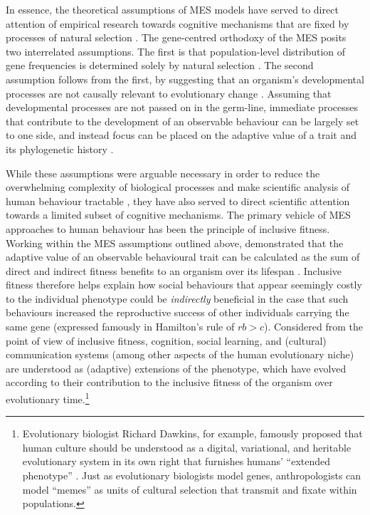 \begin{CJK}{UTF8}{gbsn}
In essence, the theoretical assumptions of MES models have served to direct attention of empirical research towards cognitive mechanisms that are fixed by processes of natural selection \citep{Lickliter2003,Kenrick2001}.  The gene-centred orthodoxy of the MES posits two interrelated assumptions.  The first is that population-level distribution of gene frequencies is determined solely by natural selection \citep[including associated stochastic mechanisms of mutation, and genetic drift][]{Grafen1991}.  The second assumption follows from the first, by suggesting that an organism's developmental processes are not causally relevant to evolutionary change \citep[also known as the ``phenotypic gambit''; see][]{Grafen1984}.  Assuming that developmental processes are not passed on in the germ-line, immediate processes that contribute to the development of an observable behaviour can be largely set to one side, and instead focus can be placed on the adaptive value of a trait and its phylogenetic history \citep{Mayr1961,Dunbar1996}.

While these assumptions were arguable necessary in order to reduce the overwhelming complexity of biological processes and make scientific analysis of human behaviour tractable \citep{Mayr1961}, they have also served to direct scientific attention towards a limited subset of cognitive mechanisms.  The primary vehicle of MES approaches to human behaviour has been the principle of inclusive fitness. Working within the MES assumptions outlined above, \textcite{Hamilton1964} demonstrated that the adaptive value of an observable behavioural trait can be calculated as the sum of direct and indirect fitness benefits to an organism over its lifespan \citep{Grafen2006}.  Inclusive fitness therefore helps explain how social behaviours that appear seemingly costly to the individual phenotype could be \textit{indirectly} beneficial in the case that such behaviours increased the reproductive success of other individuals carrying the same gene (expressed famously in Hamilton's rule of $rb > c$).  Considered from the point of view of inclusive fitness, cognition, social learning, and (cultural) communication systems (among other aspects of the human evolutionary niche) are understood as (adaptive) extensions of the phenotype, which have evolved according to their contribution to the inclusive fitness of the organism over evolutionary time.\footnote{Evolutionary biologist Richard Dawkins, for example, famously proposed that human culture should be understood as a digital, variational, and heritable evolutionary system in its own right that furnishes humans' ``extended phenotype'' \citep{Dawkins1982}.  Just as evolutionary biologists model genes, anthropologists can model ``memes'' as units of cultural selection that transmit and fixate within populations.}


\end{CJK}
